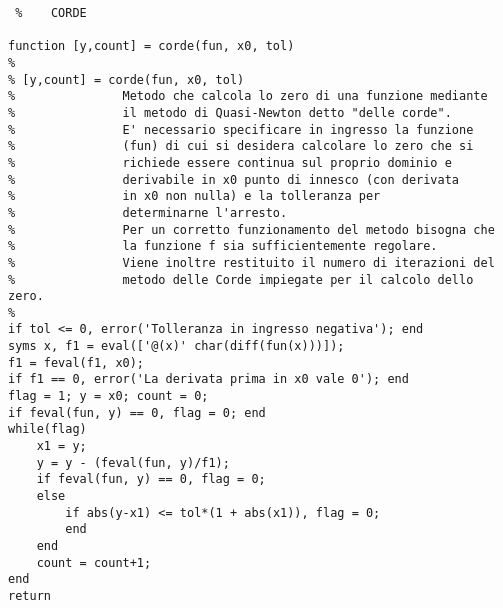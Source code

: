 \documentclass[a4paper]{report}
\begin{document}
\newpage
\begin{lstlisting} %	CORDE

function [y,count] = corde(fun, x0, tol)
%
% [y,count] = corde(fun, x0, tol)
%               Metodo che calcola lo zero di una funzione mediante 
%               il metodo di Quasi-Newton detto "delle corde".
%               E' necessario specificare in ingresso la funzione  
%               (fun) di cui si desidera calcolare lo zero che si
%               richiede essere continua sul proprio dominio e  
%               derivabile in x0 punto di innesco (con derivata
%               in x0 non nulla) e la tolleranza per
%               determinarne l'arresto.
%               Per un corretto funzionamento del metodo bisogna che
%               la funzione f sia sufficientemente regolare.
%               Viene inoltre restituito il numero di iterazioni del
%               metodo delle Corde impiegate per il calcolo dello zero.
%
if tol <= 0, error('Tolleranza in ingresso negativa'); end
syms x, f1 = eval(['@(x)' char(diff(fun(x)))]);
f1 = feval(f1, x0);
if f1 == 0, error('La derivata prima in x0 vale 0'); end
flag = 1; y = x0; count = 0;
if feval(fun, y) == 0, flag = 0; end
while(flag)
	x1 = y;
	y = y - (feval(fun, y)/f1);
	if feval(fun, y) == 0, flag = 0;
	else
		if abs(y-x1) <= tol*(1 + abs(x1)), flag = 0;
		end
	end
	count = count+1;
end
return
\end{lstlisting}
\newpage
\end{document}
